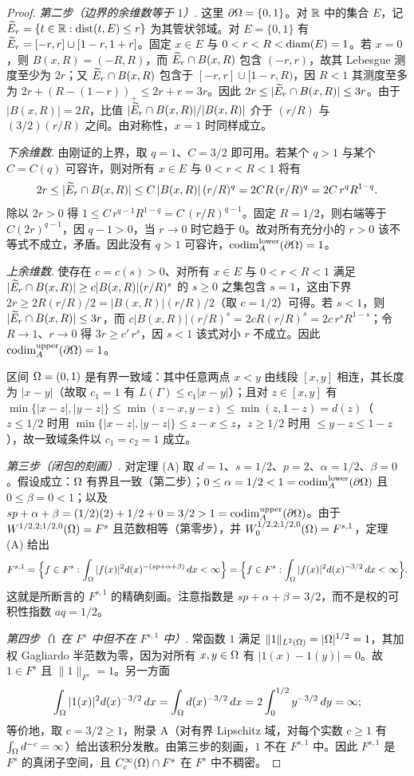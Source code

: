 \begin{proof}
\emph{第二步（边界的余维数等于 $1$）}. 这里 $\partial\Omega=\{0,1\}$。对 $\mathbb{R}$ 中的集合 $E$，记 $\widetilde E_r=\{t\in\mathbb{R}:\operatorname{dist}(t,E)\le r\}$ 为其管状邻域。对 $E=\{0,1\}$ 有 $\widetilde E_r=[-r,r]\cup[1-r,1+r]$。固定 $x\in E$ 与 $0<r<R<\operatorname{diam}(E)=1$。若 $x=0$，则 $B(x,R)=(-R,R)$，而 $\widetilde E_r\cap B(x,R)$ 包含 $(-r,r)$，故其 Lebesgue 测度至少为 $2r$；又 $\widetilde E_r\cap B(x,R)$ 包含于 $[-r,r]\cup[1-r,R)$，因 $R<1$ 其测度至多为 $2r+(R-(1-r))_+\le2r+r=3r$。因此 $2r\le|\widetilde E_r\cap B(x,R)|\le3r$。由于 $|B(x,R)|=2R$，比值 $|\widetilde E_r\cap B(x,R)|/|B(x,R)|$ 介于 $(r/R)$ 与 $(3/2)(r/R)$ 之间。由对称性，$x=1$ 时同样成立。

\emph{下余维数}. 由刚证的上界，取 $q=1$、$C=3/2$ 即可用。若某个 $q>1$ 与某个 $C=C(q)$ 可容许，则对所有 $x\in E$ 与 $0<r<R<1$ 将有
\[
  2r\le|\widetilde E_r\cap B(x,R)|\le C\,|B(x,R)|\,(r/R)^q=2CR\,(r/R)^q=2C\,r^qR^{1-q}.
\]
除以 $2r>0$ 得 $1\le C\,r^{q-1}R^{1-q}=C\,(r/R)^{q-1}$。固定 $R=1/2$，则右端等于 $C(2r)^{q-1}$，因 $q-1>0$，当 $r\to0$ 时它趋于 $0$。故对所有充分小的 $r>0$ 该不等式不成立，矛盾。因此没有 $q>1$ 可容许，$\operatorname{codim}_{A}^{\mathrm{lower}}(\partial\Omega)=1$。

\emph{上余维数}. 使存在 $c=c(s)>0$、对所有 $x\in E$ 与 $0<r<R<1$ 满足 $|\widetilde E_r\cap B(x,R)|\ge c|B(x,R)|(r/R)^s$ 的 $s\ge0$ 之集包含 $s=1$，这由下界 $2r\ge2R(r/R)/2=|B(x,R)|(r/R)/2$（取 $c=1/2$）可得。若 $s<1$，则 $|\widetilde E_r\cap B(x,R)|\le3r$，而 $c|B(x,R)|(r/R)^s=2cR(r/R)^s=2c\,r^sR^{1-s}$；令 $R\to1$、$r\to0$ 得 $3r\ge c'\,r^s$，因 $s<1$ 该式对小 $r$ 不成立。因此 $\operatorname{codim}_{A}^{\mathrm{upper}}(\partial\Omega)=1$。

区间 $\Omega=(0,1)$ 是有界一致域：其中任意两点 $x<y$ 由线段 $[x,y]$ 相连，其长度为 $|x-y|$（故取 $c_1=1$ 有 $L(\Gamma)\le c_1|x-y|$）；且对 $z\in[x,y]$ 有 $\min\{|x-z|,|y-z|\}\le\min(z-x,y-z)\le\min(z,1-z)=d(z)$（$z\le1/2$ 时用 $\min\{|x-z|,|y-z|\}\le z-x\le z$，$z\ge1/2$ 时用 $\le y-z\le1-z$），故一致域条件以 $c_1=c_2=1$ 成立。

\emph{第三步（闭包的刻画）}. 对定理 (A) 取 $d=1$、$s=1/2$、$p=2$、$\alpha=1/2$、$\beta=0$。假设成立：$\Omega$ 有界且一致（第二步）；$0\le\alpha=1/2<1=\operatorname{codim}_{A}^{\mathrm{lower}}(\partial\Omega)$ 且 $0\le\beta=0<1$；以及 $sp+\alpha+\beta=(1/2)(2)+1/2+0=3/2>1=\operatorname{codim}_{A}^{\mathrm{upper}}(\partial\Omega)$。由于 $W^{1/2,2;1/2,0}(\Omega)=F^s$ 且范数相等（第零步），并 $W_0^{1/2,2;1/2,0}(\Omega)=F^{s,1}$，定理 (A) 给出
\[
  F^{s,1}=\Big\{f\in F^s:\int_\Omega|f(x)|^2d(x)^{-(sp+\alpha+\beta)}\,dx<\infty\Big\}
  =\Big\{f\in F^s:\int_\Omega|f(x)|^2d(x)^{-3/2}\,dx<\infty\Big\}.
\]
这就是所断言的 $F^{s,1}$ 的精确刻画。注意指数是 $sp+\alpha+\beta=3/2$，而不是权的可积性指数 $aq=1/2$。

\emph{第四步（$1$ 在 $F^s$ 中但不在 $F^{s,1}$ 中）}. 常函数 $1$ 满足 $\|1\|_{L^2(\Omega)}=|\Omega|^{1/2}=1$，其加权 Gagliardo 半范数为零，因为对所有 $x,y\in\Omega$ 有 $|1(x)-1(y)|=0$。故 $1\in F^s$ 且 $\|1\|_{F^s}=1$。另一方面
\[
  \int_\Omega|1(x)|^2d(x)^{-3/2}\,dx=\int_\Omega d(x)^{-3/2}\,dx=2\int_0^{1/2}y^{-3/2}\,dy=\infty;
\]
等价地，取 $c=3/2\ge1$，附录 A（对有界 Lipschitz 域，对每个实数 $c\ge1$ 有 $\int_\Omega d^{-c}=\infty$）给出该积分发散。由第三步的刻画，$1$ 不在 $F^{s,1}$ 中。因此 $F^{s,1}$ 是 $F^s$ 的真闭子空间，且 $C_c^\infty(\Omega)\cap F^s$ 在 $F^s$ 中不稠密。


\end{proof}
